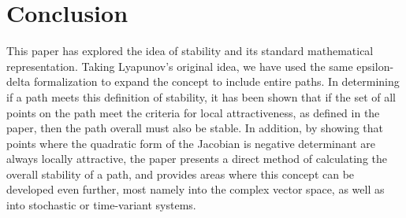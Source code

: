 \documentclass{article}
\theoremstyle{definition}
\theoremstyle{remark}
\begin{document}
\section{Conclusion}
This paper has explored the idea of stability and its standard mathematical 
representation. Taking Lyapunov's original idea, we have used the same
epsilon-delta formalization to expand the concept to include entire paths.
In determining if a path meets this definition of stability, it has been
shown that if the set of all points on the path meet the criteria for 
local attractiveness, as defined in the paper, then the path overall must 
also be stable. In addition, by showing that points where the quadratic form
of the Jacobian is negative determinant are always locally attractive, the paper
presents a direct method of calculating the overall stability of a path, and 
provides areas where this concept can be developed even further, most namely into
the complex vector space, as well as into stochastic or time-variant systems. 


\pagebreak
\medskip



\end{document}
